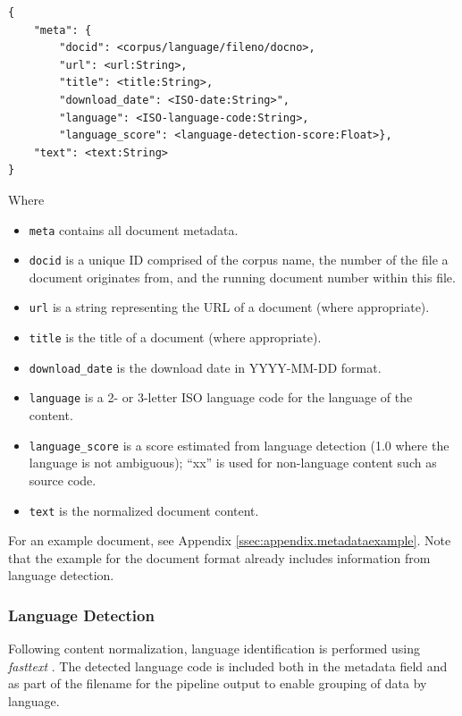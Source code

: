 \begin{verbatim}
{
    "meta": {
        "docid": <corpus/language/fileno/docno>,
        "url": <url:String>,
        "title": <title:String>,      
        "download_date": <ISO-date:String>",
        "language": <ISO-language-code:String>,
        "language_score": <language-detection-score:Float>},
    "text": <text:String>
}
\end{verbatim}
\noindent
Where
\begin{itemize}
\item \texttt{meta} contains all document metadata.
\item \texttt{docid} is a unique ID comprised of the corpus name, the number of the file a document originates from, and the running document number within this file.
\item \texttt{url} is a string representing the URL of a document (where appropriate).
\item \texttt{title} is the title of a document (where appropriate).
\item \texttt{download\_date} is the download date in YYYY-MM-DD format.
\item \texttt{language} is a 2- or 3-letter ISO language code \cite{iso639} for the language of the content.
\item \texttt{language\_score} is a score estimated from language detection \cite{joulin_grave_etal2016a} (1.0 where the language is not ambiguous); ``xx'' is used for non-language content such as source code.
\item \texttt{text} is the normalized document content. 
\end{itemize}
For an example document, see Appendix \ref{ssec:appendix.metadataexample}.
Note that the example for the document format 
already includes information from language detection.

\subsubsection{Language Detection}
\label{sec:pipelines.curated.langdetect}

Following content normalization, language identification is performed using \textit{fasttext} \cite{joulin_grave_etal2016a}. The detected language code is included both in the metadata field and as part of the filename for the pipeline output to enable grouping of data by language. %


